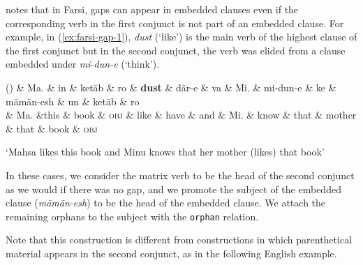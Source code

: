 \documentclass[lucida,biblatex]{sp} %
\newcounter{excounter}
\begin{document}
\citet{Farudi2013} notes that in Farsi, gaps can appear in embedded clauses even if 
the corresponding verb in the first conjunct is not part of an embedded clause. For example, 
in (\ref{ex:farsi-gap-1}), \textit{dust} (`like') is the main verb 
of the highest clause of the first conjunct but in the second conjunct, the verb was elided from 
a clause embedded under \textit{mi-dun-e} (`think'). 
 \begin{center}
    \label{ex:farsi-gap-1}
    \footnotesize
    \begin{dependency}[edge unit distance=2.5ex]
      \begin{deptext}
        (\theexcounter) 
       \& Ma. \& in \& ket\=ab \& ro \& \textbf{dust} \& d\=ar-e \& va \& Mi. \& mi-dun-e \& ke \& m\=am\=an-esh \& un \& ket\=ab \& ro \\
        \& Ma. \&this \& book \& \textsc{obj} \& like \& have \& and \& Mi. \& know \& that \& mother \& that \& book \&  \textsc{obj} \\
      \end{deptext}
    \end{dependency}
    \trans `Mahsa likes this book and Minu knows that her mother (likes) that book' \\ \normalsize \null \hfill \citep{Farudi2013}
  \end{center}



\noindent In these cases, we consider the matrix verb 
to be the head of the second conjunct as we would if there was no gap, and we promote the 
subject of the embedded clause (\textit{m\=am\=an-esh}) to be the head of the embedded clause. 
We attach the remaining orphans to the subject with the \texttt{orphan} relation.



Note that this construction is different from constructions in which parenthetical material \citep{Pollard1994}
appears in the second conjunct, as in the following English example.
\end{document}
